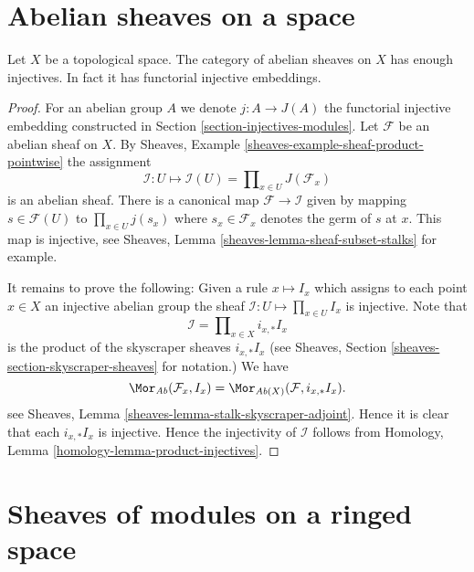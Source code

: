 \section{Abelian sheaves on a space}
\label{section-abelian-sheaves-space}


\begin{lemma}
\label{lemma-abelian-sheaves-space}
Let $X$ be a topological space.
The category of abelian sheaves on $X$ has enough injectives.
In fact it has functorial injective embeddings.
\end{lemma}

\begin{proof}
For an abelian group $A$ we denote $j : A \to J(A)$ the functorial
injective embedding constructed in Section \ref{section-injectives-modules}.
Let $\mathcal{F}$ be an abelian sheaf on $X$.
By Sheaves, Example \ref{sheaves-example-sheaf-product-pointwise}
the assignment
$$
\mathcal{I} : U \mapsto
\mathcal{I}(U) = \prod\nolimits_{x\in U} J(\mathcal{F}_x)
$$
is an abelian sheaf. There is a canonical map $\mathcal{F} \to \mathcal{I}$
given by mapping $s \in \mathcal{F}(U)$ to $\prod_{x \in U} j(s_x)$
where $s_x \in \mathcal{F}_x$ denotes the germ of $s$ at $x$.
This map is injective, see
Sheaves, Lemma \ref{sheaves-lemma-sheaf-subset-stalks}
for example.

\medskip\noindent
It remains to prove the following: Given a rule
$x \mapsto I_x$ which assigns to each point $x \in X$ an injective
abelian group the sheaf $\mathcal{I} : U \mapsto \prod_{x \in U} I_x$
is injective. Note that
$$
\mathcal{I} = \prod\nolimits_{x \in X} i_{x, *}I_x
$$
is the product of the skyscraper sheaves $i_{x, *}I_x$ (see
Sheaves, Section \ref{sheaves-section-skyscraper-sheaves} for notation.)
We have
$$
\Mor_{\textit{Ab}}(\mathcal{F}_x, I_x)
=
\Mor_{\textit{Ab}(X)}(\mathcal{F}, i_{x, *}I_x).
$$
see Sheaves, Lemma \ref{sheaves-lemma-stalk-skyscraper-adjoint}. Hence it is
clear that each $i_{x, *}I_x$ is injective. Hence the injectivity of
$\mathcal{I}$ follows from
Homology, Lemma \ref{homology-lemma-product-injectives}.
\end{proof}









\section{Sheaves of modules on a ringed space}
\label{section-sheaves-modules-space}


